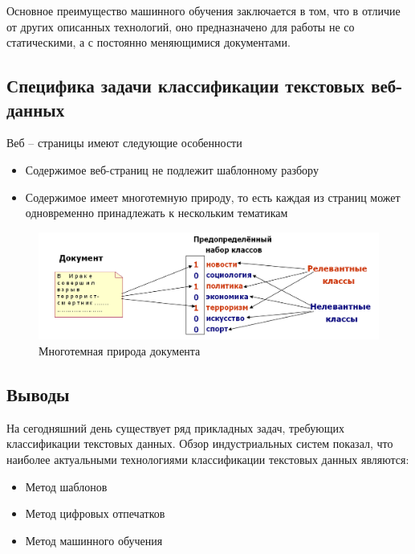\documentclass[russian, utf8, emptystyle]{eskdtext}
\begin{document}
Основное преимущество машинного обучения заключается в том, что в отличие от других описанных технологий, оно предназначено для работы не со статическими, а с постоянно меняющимися документами.\\
\subsection{Специфика задачи классификации текстовых веб-данных}
Веб – страницы имеют следующие особенности
\begin{itemize}
	\item Содержимое веб-страниц не подлежит шаблонному разбору
	\item Содержимое имеет многотемную природу, то есть каждая  из страниц может одновременно принадлежать к нескольким тематикам
\end{itemize}
	\begin{figure}[h]
		\begin{center}
			\includegraphics[width=14cm]{pic/Nature.png}
			\caption{Многотемная природа документа}
			\label{fig:low_sigma}
		\end{center}
	\end{figure}
\subsection{Выводы}
На сегодняшний день существует ряд прикладных задач, требующих классификации текстовых данных. Обзор индустриальных систем показал, что наиболее актуальными технологиями классификации текстовых данных являются:
\begin{itemize}
	\item Метод шаблонов
	\item Метод цифровых отпечатков
	\item Метод машинного обучения
\end{itemize}
\end{document}
